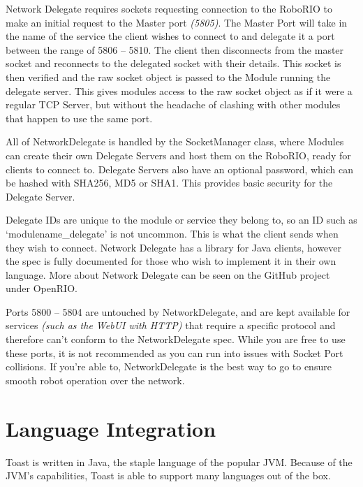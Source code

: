 \documentclass[a4paper,12pt]{article}
\begin{document}
Network Delegate requires sockets requesting connection to the RoboRIO to make an initial request to the Master port \textit{(5805)}. The Master Port will take in the name of the service the client wishes to connect to and delegate it a port between the range of 5806 -- 5810. The client then disconnects from the master socket and reconnects to the delegated socket with their details. This socket is then verified and the raw socket object is passed to the Module running the delegate server. This gives modules access to the raw socket object as if it were a regular TCP Server, but without the headache of clashing with other modules that happen to use the same port.

All of NetworkDelegate is handled by the SocketManager class, where Modules can create their own Delegate Servers and host them on the RoboRIO, ready for clients to connect to. Delegate Servers also have an optional password, which can be hashed with SHA256, MD5 or SHA1. This provides basic security for the Delegate Server. 

Delegate IDs are unique to the module or service they belong to, so an ID such as `modulename\_delegate' is not uncommon. This is what the client sends when they wish to connect. Network Delegate has a library for Java clients, however the spec is fully documented for those who wish to implement it in their own language. More about Network Delegate can be seen on the GitHub project under OpenRIO.

Ports 5800 -- 5804 are untouched by NetworkDelegate, and are kept available for services \textit{(such as the WebUI with HTTP)} that require a specific protocol and therefore can't conform to the NetworkDelegate spec. While you are free to use these ports, it is not recommended as you can run into issues with Socket Port collisions. If you're able to, NetworkDelegate is the best way to go to ensure smooth robot operation over the network.

\newpage

\section{Language Integration}
Toast is written in Java, the staple language of the popular JVM. Because of the JVM's capabilities, Toast is able to support many languages out of the box.
\end{document}
